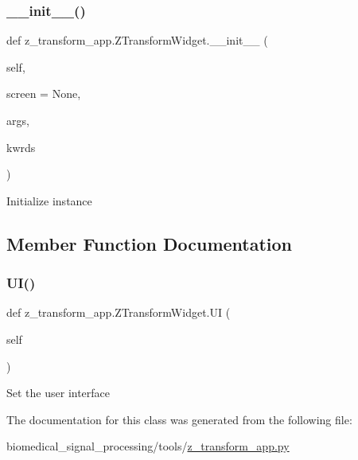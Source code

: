 \subsubsection{\texorpdfstring{\+\_\+\+\_\+init\+\_\+\+\_\+()}{\_\_init\_\_()}}
{\footnotesize\ttfamily def z\+\_\+transform\+\_\+app.\+Z\+Transform\+Widget.\+\_\+\+\_\+init\+\_\+\+\_\+ (\begin{DoxyParamCaption}\item[{}]{self,  }\item[{}]{screen = {\ttfamily None},  }\item[{}]{args,  }\item[{}]{kwrds }\end{DoxyParamCaption})}

\begin{DoxyVerb}Initialize instance
\end{DoxyVerb}
 

\subsection{Member Function Documentation}
\mbox{\label{classz__transform__app_1_1ZTransformWidget_ad806831916f7d8246a281dbcc3ea58f7}} 
\subsubsection{\texorpdfstring{U\+I()}{UI()}}
{\footnotesize\ttfamily def z\+\_\+transform\+\_\+app.\+Z\+Transform\+Widget.\+UI (\begin{DoxyParamCaption}\item[{}]{self }\end{DoxyParamCaption})}

\begin{DoxyVerb}Set the user interface
\end{DoxyVerb}
 

The documentation for this class was generated from the following file\+:\begin{DoxyCompactItemize}
\item 
biomedical\+\_\+signal\+\_\+processing/tools/\hyperlink{z__transform__app_8py}{z\+\_\+transform\+\_\+app.\+py}\end{DoxyCompactItemize}
